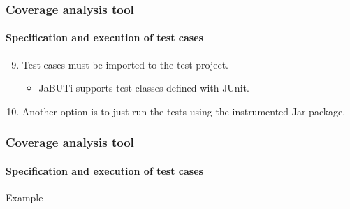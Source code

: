 \begin{frame}[parent={cmap:coverage-analysis-tool},hasnext=true,hasprev=true]
\frametitle{Coverage analysis tool}
\framesubtitle{Specification and execution of test cases}
\label{concept:jabuti-test-case-execution}

\begin{block:procedure}{}
\begin{enumerate}
	\setcounter{enumi}{8}
	\item Test cases must be imported to the test project.
	\begin{itemize}
		\item JaBUTi supports test classes defined with JUnit.
	\end{itemize}

	\item Another option is to just run the tests using the instrumented
	Jar package.
\end{enumerate}
\end{block:procedure}
\end{frame}



\begin{frame}[c]
\frametitle{Coverage analysis tool}
\framesubtitle{Specification and execution of test cases}

\begin{block}{Example}
\end{block}
\end{frame}

